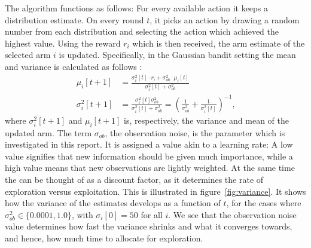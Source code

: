 The algorithm functions as follows: For every available action it keeps a distribution estimate.
On every round $t$, it picks an action by drawing a random number from each distribution and selecting the action which achieved the highest value.
Using the reward $r_i$ which is then received, the arm estimate of the selected arm $i$ is updated.
Specifically, in the Gaussian bandit setting the mean and variance is calculated as follows \cite{Murphy2007}:
\begin{align*}
    \mu_i [t + 1] &= \frac{\sigma_i^2 [t] \cdot r_i + \sigma_{ob}^2 \cdot \mu_i [t]}{\sigma_i^2 [t] + \sigma_{ob}^2} \\
    \sigma_i^2 [t + 1] &= \frac{\sigma_i^2 [t] \sigma_{ob}^2}{\sigma_i^2 [t] + \sigma_{ob}^2} = \left(\frac{1}{\sigma_{ob}^2} + \frac{1}{\sigma_i^2 [t]} \right)^{-1} \text{,}
\end{align*}
where $\sigma_i^2 [t + 1]$ and $\mu_i [t + 1]$ is, respectively, the variance and mean of the updated arm.
The term $\sigma_{ob}$, the observation noise, is the parameter which is investigated in this report.
It is assigned a value akin to a learning rate: A low value signifies that new information should be given much importance, while a high value means that new observations are lightly weighted.
At the same time the \ob{} can be thought of as a discount factor, as it determines the rate of exploration versus exploitation.
This is illustrated in figure~\ref{fig:variance}. 
It shows how the variance of the estimates develops as a function of $t$, for the cases where $\sigma_{ob}^2 \in \{0.0001, 1.0\}$, with $\sigma_i [0] = 50$ for all $i$.
We see that the observation noise value determines how fast the variance shrinks and what it converges towards, and hence, how much time to allocate for exploration.

